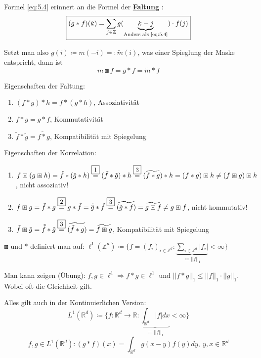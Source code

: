 \documentclass{article}
\theoremstyle{plain}
\theoremstyle{definition}
\numberwithin{equation}{section}
\newcommand{\norm}[1] {
\left|\left| #1 \right|\right|
}
\newcommand{\abs}[1] {
\left| #1 \right|
}
\newcommand{\R}[0] {
\mathbb R
}
\newcommand{\Z}[0] {
    \mathbb Z
}
\newcommand{\mim}[1] {
\underline{\textbf{#1\index{#1}}}
}
\newcommand{\C}[0]{
    \cdot
}
\begin{document}
        Formel \eqref{eq:5.4} erinnert an die Formel der \mim{Faltung}:
        \begin{equation}\label{eq:5.5}
            \framebox{$\displaystyle (g * f)(k) = \sum_{j \in \Z} g(\underbrace{k-j}_{\text{Anders als \eqref{eq:5.4}}}) \cdot f(j)$}
        \end{equation}

        Setzt man also $g(i)  \coloneqq  m(-i) =: \tilde m(i)$, was einer Spieglung der Maske entspricht, dann ist
        \[m \boxast f = g * f = \tilde m * f\]

        Eigenschaften der Faltung:
        \begin{enumerate}[label=\framebox{\arabic *}]
            \item $(f * g) * h = f * (g* h)$, Assoziativität
            \item $f*g=g*f$, Kommutativität
            \item $\tilde f * \tilde g = \widetilde{f * g}$, Kompatibilität mit Spiegelung
        \end{enumerate}
        Eigenschaften der Korrelation:
        \begin{enumerate}[label=\framebox{\arabic *'}]
            \item $f \boxast (g \boxast h) = \tilde f * ( \tilde g* h) \overset{\framebox{\small 1}}{=} ( \tilde f * \tilde g) * h \overset{\framebox{\small 3}}{=} (\widetilde{f * g}) * h = (f * g) \boxast h \neq (f \boxast g) \boxast h$, nicht assoziativ!
            \item $f \boxast g = \tilde f * g \overset{\framebox{\small 2}}{=} g * \tilde f = \tilde{\tilde g} * \tilde f \overset{\framebox{\small 3}}{=} \widetilde{(\tilde g * f)} = \widetilde{g \boxast f} \neq g \boxast f$, nicht kommutativ!
            \item $\tilde f \boxast \tilde g = \tilde{\tilde f} * \tilde g \overset{\framebox{\small 3}}{=} \widetilde{(\tilde f * g)} = \widetilde{f \boxast g}$, Kompatibilität mit Spiegelung
        \end{enumerate}

	$\boxast$ und $*$ definiert man auf: $\ell^1(\Z^d) \coloneqq \{f=(f_i)_{i \in \Z^d} : \underbrace{\sum_{i \in \Z^d}\abs{f_i}}_{ \coloneqq \norm{f}_1} < \infty\}$

	Man kann zeigen (Übung): $f,g \in \ell^1 \Rightarrow f * g \in \ell^1$ und $\norm{f * g}_1 \leq \norm{f}_1 \C \norm{g}_1$.
    Wobei oft die Gleichheit gilt.

    Alles gilt auch in der Kontinuierlichen Version:
    \[L^1(\R^d)  \coloneqq  \{f:\R^d \to \R : \underbrace{\int_{\R^d}\abs{f} dx}_{ \coloneqq \norm{f}_1} < \infty\}\]
    \[f,g \in L^1(\R^d): (g*f)(x)=\int_{\R^d}g(x-y)f(y) dy, \ y,x \in \R^d\]
\end{document}

